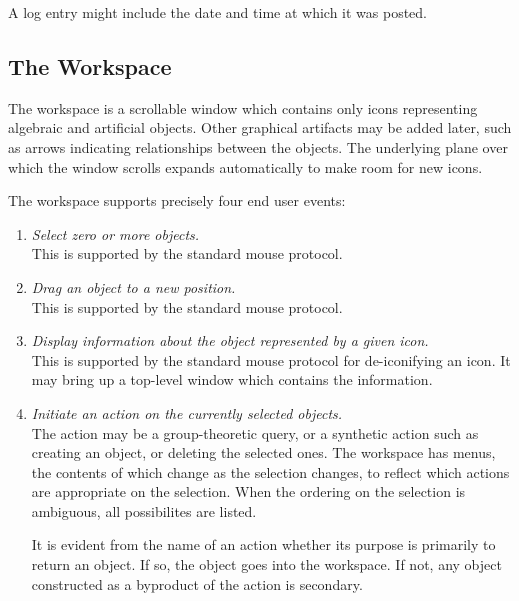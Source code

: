 A log entry might include the date and time at which it was posted.


\subsection{The Workspace}\label{The_Workspace}

The workspace is a scrollable window which contains only icons
representing algebraic and artificial objects. Other graphical
artifacts may be added later, such as arrows indicating relationships
between the objects. The underlying plane over which the window
scrolls expands automatically to make room for new icons.

The workspace supports precisely four end user events:

\begin{enumerate}

\item
{\em Select zero or more objects.}\\
This is supported by the standard mouse protocol.

\item
{\em Drag an object to a new position.}\\
This is supported by the standard mouse protocol.

\item
{\em Display information about the object represented by a given
icon.}\\
This is supported by the standard mouse protocol for de-iconifying an
icon.  It may bring up a top-level window which contains the
information.

\item
{\em Initiate an action on the currently selected objects.}\\
The action may be a group-theoretic query, or a synthetic action such
as creating an object, or deleting the selected ones.  The workspace
has menus, the contents of which change as the selection changes, to
reflect which actions are appropriate on the selection. When the
ordering on the selection is ambiguous, all possibilites are listed.

It is evident from the name of an action whether its purpose is
primarily to return an object. If so, the object goes into the
workspace. If not, any object constructed as a byproduct of the action
is secondary.

\end{enumerate}

